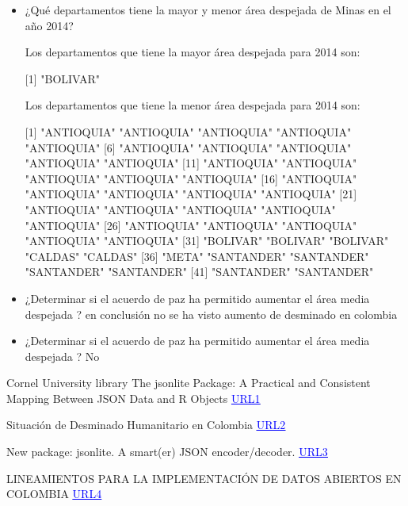 \documentclass[conference]{IEEEtran}\usepackage[]{graphicx}\usepackage[]{color}
\begin{document}
\begin{itemize}
	\item ¿Qué departamentos tiene la mayor y menor área despejada de Minas en el año 2014?

	Los departamentos que tiene la mayor área despejada para 2014 son:
	
	
[1] "BOLIVAR"

	Los departamentos que tiene la menor área despejada para 2014 son:
	
	
 [1] "ANTIOQUIA" "ANTIOQUIA" "ANTIOQUIA" "ANTIOQUIA" "ANTIOQUIA"
 [6] "ANTIOQUIA" "ANTIOQUIA" "ANTIOQUIA" "ANTIOQUIA" "ANTIOQUIA"
[11] "ANTIOQUIA" "ANTIOQUIA" "ANTIOQUIA" "ANTIOQUIA" "ANTIOQUIA"
[16] "ANTIOQUIA" "ANTIOQUIA" "ANTIOQUIA" "ANTIOQUIA" "ANTIOQUIA"
[21] "ANTIOQUIA" "ANTIOQUIA" "ANTIOQUIA" "ANTIOQUIA" "ANTIOQUIA"
[26] "ANTIOQUIA" "ANTIOQUIA" "ANTIOQUIA" "ANTIOQUIA" "ANTIOQUIA"
[31] "BOLIVAR"   "BOLIVAR"   "BOLIVAR"   "CALDAS"    "CALDAS"   
[36] "META"      "SANTANDER" "SANTANDER" "SANTANDER" "SANTANDER"
[41] "SANTANDER" "SANTANDER"

	



	\item ¿Determinar si el acuerdo de paz ha permitido aumentar el área media despejada ?
	en conclusión no se ha visto aumento de desminado en colombia
	\item ¿Determinar si el acuerdo de paz ha permitido aumentar el área media despejada ?
	No
\end{itemize}

	
	
	
	\newpage
	 \begin{thebibliography}{1}
	 	
		Cornel University library The jsonlite Package: A Practical and Consistent Mapping Between JSON Data and R Objects
	 	\href{http://arxiv.org/abs/1403.2805}{\textcolor{blue}{\underline{URL1}}}

	 	Situación de Desminado Humanitario en Colombia
	 	\href{http://www.datos.gov.co/frm/catalogo/frmCatalogo.aspx?dsId=75158}{\textcolor{blue}{\underline{URL2}}}
	 		 	
		New package: jsonlite. A smart(er) JSON encoder/decoder.
		\href{https://www.opencpu.org/posts/jsonlite-a-smarter-json-encoder/}{\textcolor{blue}{\underline{URL3}}}
		
		LINEAMIENTOS PARA LA IMPLEMENTACIÓN DE DATOS ABIERTOS EN COLOMBIA
		\href{http://ogdidata.blob.core.windows.net/documentos/articles-9407_GuiaDesarrolladores.pdf}{\textcolor{blue}{\underline{URL4}}}
		
		
	 \end{thebibliography}
	
\end{document}
